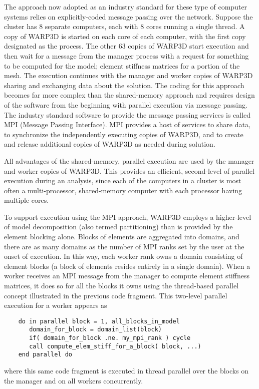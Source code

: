 The approach now adopted as an industry standard for these type of computer 
systems relies on explicitly-coded message passing over the network. Suppose 
the cluster has 
8 separate computers, each with 8 cores running a single
thread. A copy of WARP3D is started on each core of each computer, 
with the first copy designated as the  process. The 
other 63  copies of WARP3D start execution and then wait for 
a message from the manager process with a request for something to 
be computed for the model; \eg element stiffness matrices for a portion 
of the mesh. The execution continues with the manager and worker copies
of WARP3D sharing and exchanging data about the solution. The coding 
for this approach becomes far more complex than the shared-memory 
approach and requires design of the software from the beginning with 
parallel execution via message passing. The industry standard 
software to provide the message passing services is 
called MPI (Message Passing Interface). MPI provides a 
host of services to share data, to synchronize the 
independently executing copies of WARP3D, and to create and release additional
copies of WARP3D as needed during solution.

All advantages of the shared-memory, parallel execution are used by the 
manager and worker copies of WARP3D. This provides an efficient, 
second-level of parallel execution during an analysis, since each of 
the computers in a cluster is most often a multi-processor, shared-memory 
computer with each processor having multiple cores.

To support execution using the MPI approach, 
WARP3D employs a higher-level of 
model decomposition (also termed partitioning)
than is provided by the element blocking alone.
Blocks of elements are aggregated into domains, and there are as 
many domains as the number of MPI ranks set by the
user at the onset of execution. 
In this way, each worker rank owns a domain consisting of 
element blocks (a block of elements resides entirely in a single domain). 
When a worker receives an MPI message from the manager 
to compute element stiffness matrices, it does so for 
all the blocks it owns using the thread-based parallel concept 
illustrated in the previous code fragment. This two-level 
parallel execution for a worker appears as

\small
\begin{verbatim}
    do in parallel block = 1, all_blocks_in_model 
       domain_for_block = domain_list(block)
       if( domain_for_block .ne. my_mpi_rank ) cycle
       call compute_elem_stiff_for_a_block( block, ...)
    end parallel do 
\end{verbatim}
\normalsize
\nin where this same code fragment is executed in thread parallel 
over the blocks on the manager and on all workers concurrently.

